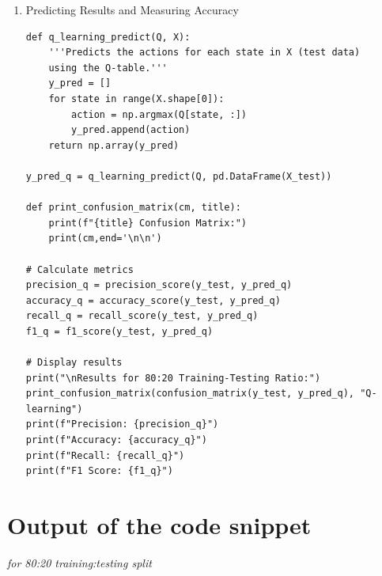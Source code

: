 \documentclass[12pt,a4paper]{report}
\begin{document}
\begin{enumerate}
\begin{verbatim}
    for _ in range(episodes):
        state = random.randint(0, n_states - 1)
        while True:
            if random.uniform(0, 1) < epsilon:
            # epsilon is our exploration rate
                action = random.randint(0, n_actions - 1)  # Explore
            else:
                action = np.argmax(Q[state, :])  # Exploit
            
            reward = y.iloc[state] if action == 1 else -y.iloc[state]
            
            next_state = (state + 1) % n_states
            Q[state, action] = Q[state, action] + 
             learning_rate * (reward + discount_factor * 
        np.max(Q[next_state, :]) - Q[state, action])
            
            state = next_state
            if state == 0:
                break
    
    return Q

# Train Q-learning model
Q = q_learning_train(pd.DataFrame(X_train), y_train)
\end{verbatim}
       \item Predicting Results and Measuring Accuracy
       \begin{verbatim}
def q_learning_predict(Q, X):
    '''Predicts the actions for each state in X (test data) 
    using the Q-table.'''
    y_pred = []
    for state in range(X.shape[0]):
        action = np.argmax(Q[state, :])
        y_pred.append(action)
    return np.array(y_pred)

y_pred_q = q_learning_predict(Q, pd.DataFrame(X_test))

def print_confusion_matrix(cm, title):
    print(f"{title} Confusion Matrix:")
    print(cm,end='\n\n')

# Calculate metrics
precision_q = precision_score(y_test, y_pred_q)
accuracy_q = accuracy_score(y_test, y_pred_q)
recall_q = recall_score(y_test, y_pred_q)
f1_q = f1_score(y_test, y_pred_q)

# Display results
print("\nResults for 80:20 Training-Testing Ratio:")
print_confusion_matrix(confusion_matrix(y_test, y_pred_q), "Q-
learning")
print(f"Precision: {precision_q}")
print(f"Accuracy: {accuracy_q}")
print(f"Recall: {recall_q}")
print(f"F1 Score: {f1_q}")
       \end{verbatim}
\end{enumerate}




\section{Output of the code snippet}\textit{for 80:20 training:testing split}
\end{document}
